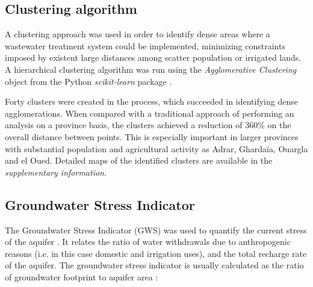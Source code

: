 
\subsection{Clustering algorithm}\label{Sc:clustering}
A clustering approach was used in order to identify dense areas where a wastewater treatment system could be implemented, minimizing constraints imposed by existent large distances among scatter population or irrigated lands. A hierarchical clustering  algorithm was run using the \textit{Agglomerative Clustering} object from the Python \textit{scikit-learn} package \cite{scikit-learn}.


Forty clusters were created in the process, which succeeded in identifying dense agglomerations. When compared with a traditional approach of performing an analysis on a province basis, the clusters achieved a reduction of 360\% on the overall distance between points. This is especially important in larger provinces with substantial population and agricultural activity as Adrar, Ghardaïa, Ouargla and el Oued. Detailed maps of the identified clusters are available in the \textit{supplementary information}.

\subsection{Groundwater Stress Indicator}
The Groundwater Stress Indicator (GWS) was used to quantify the current stress of the aquifer \cite{gleesonWaterBalanceGlobal2012,Aqueductglobalmaps2015}. It relates the ratio of water withdrawals due to anthropogenic reasons (i.e. in this case domestic and irrigation uses), and the total recharge rate of the aquifer. The groundwater stress indicator is usually calculated as the ratio of groundwater footprint to aquifer area \cite{gleesonWaterBalanceGlobal2012,RegionalGroundwaterStress2013}:

